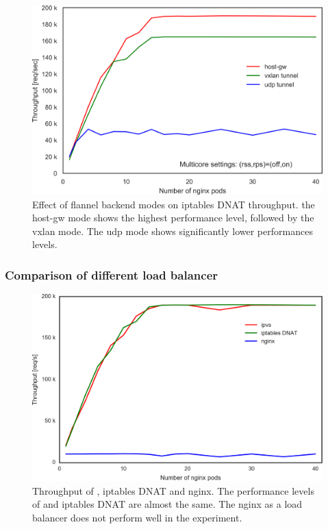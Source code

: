 \begin{figure}[h]
    \centering
    \includegraphics[width=0.75\columnwidth]{Figs/iptables_flannel_mode}

  \par\bigskip
  \centering
  \begin{minipage}{0.9\columnwidth}
    \caption[Effect of flannel backend modes on iptables DNAT throughput]{
      Effect of flannel backend modes on iptables DNAT throughput.
      the host-gw mode shows the highest performance level, followed by the vxlan mode.
      The udp mode shows significantly lower performances levels.
    }
    \label{fig:iptables_flannel_mode}
  \end{minipage}
\end{figure}

\FloatBarrier

\subsubsection{Comparison of different load balancer}

\begin{figure}[h]
  \centering
  \includegraphics[width=0.75\columnwidth]{Figs/ipvs-iptables-nginx}
  \par\bigskip
  \centering
  \begin{minipage}{0.9\columnwidth}
    \caption[Throughput of IPVS, iptables DNAT and nginx]{
      Throughput of , iptables DNAT and nginx.
      The performance levels of  and iptables DNAT are almost the same.
      The nginx as a load balancer does not perform well in the experiment.
    }
    \label{fig:ipvs-iptables-nginx}
  \end{minipage}
\end{figure}

